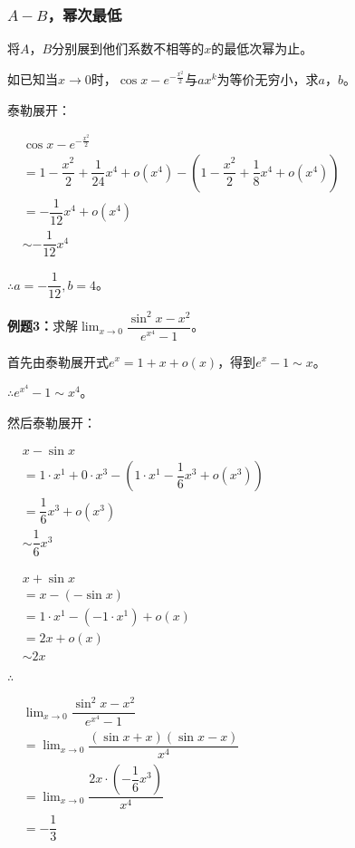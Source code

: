\documentclass[UTF8]{ctexart}
\begin{document}
\subsubsection{\texorpdfstring{$A-B$}型，幂次最低}

将$A$，$B$分别展到他们系数不相等的$x$的最低次幂为止。

如已知当$x\to 0$时，$\cos x-e^{-\frac{x^2}{2}}$与$ax^k$为等价无穷小，求$a$，$b$。

泰勒展开：

$
\begin{aligned}
    & \cos x-e^{-\frac{x^2}{2}} \\
    & = 1-\dfrac{x^2}{2}+\dfrac{1}{24}x^4+o(x^4)-\left(1-\dfrac{x^2}{2}+\dfrac{1}{8}x^4+o(x^4)\right) \\
    & = -\dfrac{1}{12}x^4+o(x^4) \\
    & \sim -\dfrac{1}{12}x^4
\end{aligned}
$

$\therefore a=-\dfrac{1}{12},b=4$。

\textbf{例题3：}求解$\lim_{x\to 0}\dfrac{\sin^2x-x^2}{e^{x^4}-1}$。

首先由泰勒展开式$e^x=1+x+o(x)$，得到$e^x-1\sim x$。

$\therefore e^{x^4}-1\sim x^4$。

然后泰勒展开：

$
\begin{aligned}
    & x-\sin x \\
    & = 1\cdot x^1+0\cdot x^3 - (1\cdot x^1-\dfrac{1}{6}x^3+o(x^3)) \\
    & = \dfrac{1}{6}x^3+o(x^3) \\
    & \sim \dfrac{1}{6}x^3
\end{aligned}
$

$
\begin{aligned}
    & x+\sin x \\
    & =x-(-\sin x) \\
    & =1\cdot x^1-(-1\cdot x^1)+o(x) \\
    & =2x+o(x) \\
    & \sim 2x
\end{aligned}
$

$\therefore$ \bigskip

$
\begin{aligned}
    & \lim_{x\to 0}\dfrac{\sin^2x-x^2}{e^{x^4}-1} \\
    & =\lim_{x\to 0}\dfrac{(\sin x+x)(\sin x-x)}{x^4} \\
    & =\lim_{x\to 0}\dfrac{2x\cdot\left(-\dfrac{1}{6}x^3\right)}{x^4} \\
    & =-\dfrac{1}{3}
\end{aligned}
$
\end{document}
